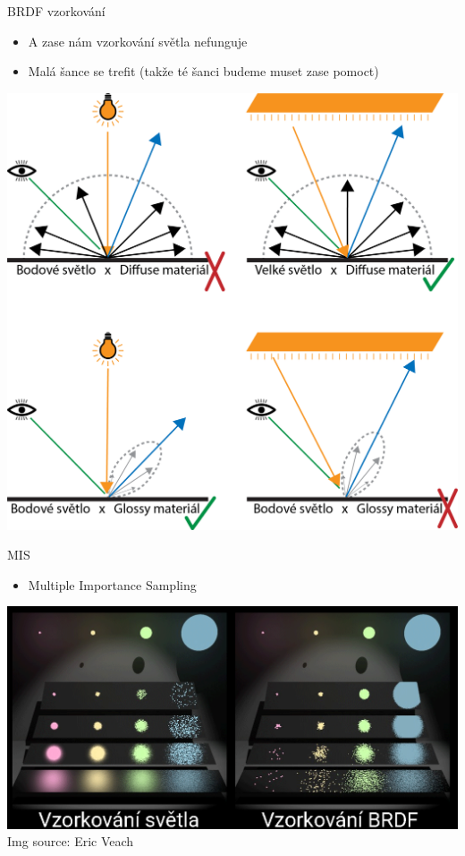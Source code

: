 \documentclass[czech]{beamer}
\begin{document}
\begin{frame}{BRDF vzorkování}
\begin{itemize}
  \item A zase nám vzorkování světla nefunguje 
  \item Malá šance se trefit (takže té šanci budeme muset zase pomoct)
\end{itemize}
\vfill
\centering \includegraphics[width=0.5\linewidth]{img/sampling strategies.png}
\end{frame}


\begin{frame}{MIS}
\begin{itemize}
  \item Multiple Importance Sampling
\end{itemize}
\vfill
{}
\vfill
\centering \includegraphics[width=.7\textwidth]{img/mis.png}\\
{\footnotesize \hfill Img source: Eric Veach}
\end{frame}
\end{document}
